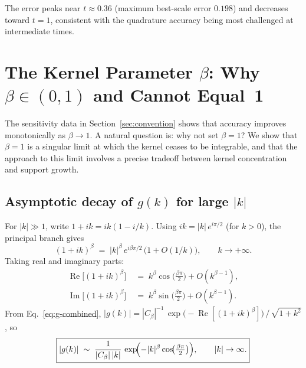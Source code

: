 \documentclass[11pt]{article}
\begin{document}
The error peaks near $t \approx 0.36$ (maximum best-scale error $0.198$)
and decreases toward $t = 1$, consistent with the quadrature accuracy
being most challenged at intermediate times.

\section{The Kernel Parameter $\beta$: Why $\beta \in (0,1)$ and Cannot Equal~1}\label{sec:beta}

The sensitivity data in Section~\ref{sec:convention} shows that accuracy
improves monotonically as $\beta \to 1$.  A natural question is: why not
set $\beta = 1$?  We show that $\beta = 1$ is a singular limit at which
the kernel ceases to be integrable, and that the approach to this limit
involves a precise tradeoff between kernel concentration and support
growth.

\subsection{Asymptotic decay of $g(k)$ for large $|k|$}

For $|k| \gg 1$, write $1 + ik = ik(1 - i/k)$.  Using
$ik = |k|\,e^{i\pi/2}$ (for $k > 0$), the principal branch gives
\begin{equation}\label{eq:asymp-base}
  (1+ik)^\beta \;=\; |k|^\beta\,e^{i\beta\pi/2}\,\bigl(1 + O(1/k)\bigr),
  \qquad k \to +\infty.
\end{equation}
Taking real and imaginary parts:
\begin{align}
  \operatorname{Re}\!\bigl[(1+ik)^\beta\bigr]
  &\;=\; k^\beta\cos\!\bigl(\tfrac{\beta\pi}{2}\bigr) + O(k^{\beta-1}),
  \label{eq:re-asymp} \\
  \operatorname{Im}\!\bigl[(1+ik)^\beta\bigr]
  &\;=\; k^\beta\sin\!\bigl(\tfrac{\beta\pi}{2}\bigr) + O(k^{\beta-1}).
  \label{eq:im-asymp}
\end{align}
From Eq.~\eqref{eq:g-combined}, $|g(k)| = |C_\beta|^{-1}\,
\exp\!\bigl(-\operatorname{Re}[(1+ik)^\beta]\bigr)\,/\,\sqrt{1+k^2}$, so
\begin{equation}\label{eq:g-decay}
  \boxed{%
  |g(k)| \;\sim\; \frac{1}{|C_\beta|\,|k|}\,
  \exp\!\Bigl(-|k|^\beta\cos\!\bigl(\tfrac{\beta\pi}{2}\bigr)\Bigr),
  \qquad |k| \to \infty.}
\end{equation}
\end{document}
